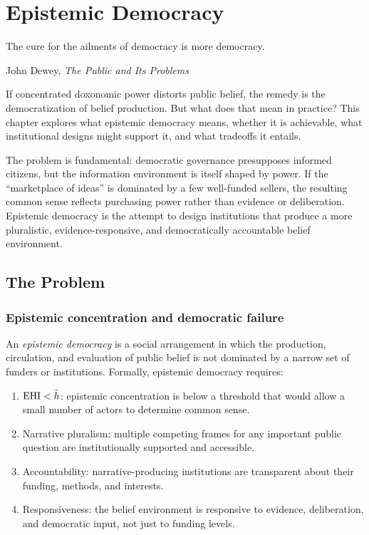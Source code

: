\chapter{Epistemic Democracy}
\label{ch:epistemic-democracy}

\epigraph{The cure for the ailments of democracy is more democracy.}{John Dewey, \textit{The Public and Its Problems}}

\noindent
If concentrated doxonomic power distorts public belief, the remedy is the democratization of belief production.
But what does that mean in practice?
This chapter explores what epistemic democracy means, whether it is achievable, what institutional designs might support it, and what tradeoffs it entails.

The problem is fundamental: democratic governance presupposes informed citizens, but the information environment is itself shaped by power.
If the ``marketplace of ideas'' is dominated by a few well-funded sellers, the resulting common sense reflects purchasing power rather than evidence or deliberation.
Epistemic democracy is the attempt to design institutions that produce a more pluralistic, evidence-responsive, and democratically accountable belief environment.

\section{The Problem}
\label{sec:ch32-problem}

\subsection{Epistemic concentration and democratic failure}

\begin{definition}
\label{def:epistemic-democracy}
An \emph{epistemic democracy} is a social arrangement in which the production, circulation, and evaluation of public belief is not dominated by a narrow set of funders or institutions.
Formally, epistemic democracy requires:
\begin{enumerate}[nosep]
  \item $\mathrm{EHI} < \bar{h}$: epistemic concentration is below a threshold that would allow a small number of actors to determine common sense.
  \item Narrative pluralism: multiple competing frames for any important public question are institutionally supported and accessible.
  \item Accountability: narrative-producing institutions are transparent about their funding, methods, and interests.
  \item Responsiveness: the belief environment is responsive to evidence, deliberation, and democratic input, not just to funding levels.
\end{enumerate}
\end{definition}

